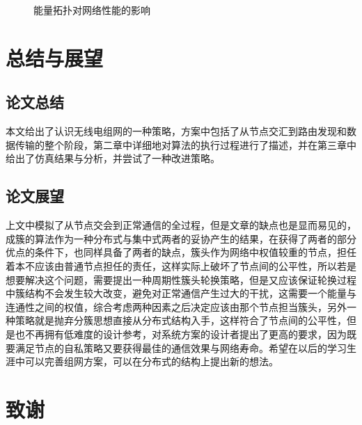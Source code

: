 \documentclass[a4paper,AutoFakeBold,oneside,12pt]{book}
\begin{document}
\begin{figure}[htbp]
{\begin{minipage}{7cm}
  \end{minipage}}
  \caption{能量拓扑对网络性能的影响}  
  \label{fig:4}               
   \end{figure}
  \chapter{总结与展望}
\section{论文总结}
  本文给出了认识无线电组网的一种策略，方案中包括了从节点交汇到路由发现和数据传输的整个阶段，第二章中详细地对算法的执行过程进行了描述，并在第三章中给出了仿真结果与分析，并尝试了一种改进策略。
 \section{论文展望}
  上文中模拟了从节点交会到正常通信的全过程，但是文章的缺点也是显而易见的，成簇的算法作为一种分布式与集中式两者的妥协产生的结果，在获得了两者的部分优点的条件下，也同样具备了两者的缺点，簇头作为网络中权值较重的节点，担任着本不应该由普通节点担任的责任，这样实际上破坏了节点间的公平性，所以若是想要解决这个问题，需要提出一种周期性簇头轮换策略，但是又应该保证轮换过程中簇结构不会发生较大改变，避免对正常通信产生过大的干扰，这需要一个能量与连通性之间的权值，综合考虑两种因素之后决定应该由那个节点担当簇头，另外一种策略就是抛弃分簇思想直接从分布式结构入手，这样符合了节点间的公平性，但是也不再拥有低难度的设计参考，对系统方案的设计者提出了更高的要求，因为既要满足节点的自私策略又要获得最佳的通信效果与网络寿命。希望在以后的学习生涯中可以完善组网方案，可以在分布式的结构上提出新的想法。
\clearpage{}


\clearpage{}
\chapter*{致\qquad{}谢}
 \normalsize\thankwords


\newpage\backmatter
\setcounter{chapter}{0}
\renewcommand{\thefigure}{~外\arabic{chapter}-\arabic{figure}~}
\renewcommand{\theequation}{~外\arabic{chapter}-\arabic{equation}~}
\renewcommand{\thetable}{~外\arabic{chapter}-\arabic{table}~}
\end{document}
